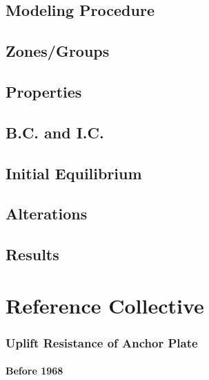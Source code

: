 \documentclass[a4paper, nobind]{templates/ociamthesis}
\begin{document}
\hypertarget{modeling-procedure-1}{%
\section{Modeling Procedure}\label{modeling-procedure-1}}

\hypertarget{zonesgroups}{%
\section{Zones/Groups}\label{zonesgroups}}

\hypertarget{properties-3}{%
\section{Properties}\label{properties-3}}

\hypertarget{b.c.-and-i.c.-1}{%
\section{B.C. and I.C.}\label{b.c.-and-i.c.-1}}

\hypertarget{initial-equilibrium-3}{%
\section{Initial Equilibrium}\label{initial-equilibrium-3}}

\hypertarget{alterations-3}{%
\section{Alterations}\label{alterations-3}}

\hypertarget{results-1}{%
\section{Results}\label{results-1}}

\hypertarget{reference-collective}{%
\chapter{Reference Collective}\label{reference-collective}}

\hypertarget{uplift-resistance-of-anchor-plate}{%
\subsection{Uplift Resistance of Anchor Plate}\label{uplift-resistance-of-anchor-plate}}

\hypertarget{before-1968}{%
\subsubsection{Before 1968}\label{before-1968}}
\end{document}
